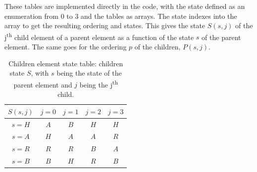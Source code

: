 \noindent
These tables are implemented directly in the code, with the state defined as an enumeration from 0
to 3 and the tables as arrays. The state indexes into the array to get the resulting ordering and
states. This gives the state \(S(s, j)\) of the j\textsuperscript{th} child element of a parent
element as a function of the state \(s\) of the parent element. The same goes for the ordering \(p\)
of the children, \(P(s, j)\).

\begin{table}[H]
    \begin{center}
        \begin{tabular}{ c | c c c c} 
            \(S( s, j )\) & \(j = 0\) & \(j = 1\) & \(j = 2\) & \(j = 3\)  \\
            \hline
            \(s = H\) & \textcolor{vs_red}{\(A\)} & \textcolor{vs_red}{\(B\)} & \textcolor{vs_red}{\(H\)} & \textcolor{vs_red}{\(H\)} \\ 
            \(s = A\) & \textcolor{vs_blue}{\(H\)} & \textcolor{vs_blue}{\(A\)} & \textcolor{vs_blue}{\(A\)} & \textcolor{vs_blue}{\(R\)} \\
            \(s = R\) & \textcolor{vs_teal}{\(R\)} & \textcolor{vs_teal}{\(R\)} & \textcolor{vs_teal}{\(B\)} & \textcolor{vs_teal}{\(A\)} \\
            \(s = B\) & \textcolor{vs_plum}{\(B\)} & \textcolor{vs_plum}{\(H\)} & \textcolor{vs_plum}{\(R\)} & \textcolor{vs_plum}{\(B\)} \\
        \end{tabular}
    
        \caption{Children element state table: children state \(S\), with \(s\) being the state of the parent element and \(j\) being the j\textsuperscript{th} child.}\label{table:children_state}
    \end{center}
\end{table}

